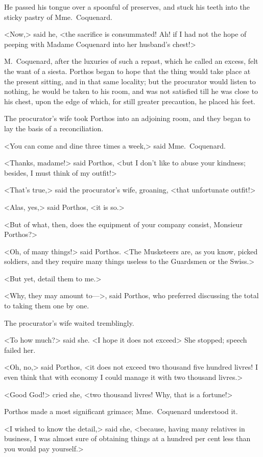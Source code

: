 He passed his tongue over a spoonful of preserves, and stuck his teeth into the sticky pastry of Mme.~Coquenard. 

<Now,> said he, <the sacrifice is consummated! Ah! if I had not the hope of peeping with Madame Coquenard into her husband's chest!> 

M.~Coquenard, after the luxuries of such a repast, which he called an excess, felt the want of a siesta. Porthos began to hope that the thing would take place at the present sitting, and in that same locality; but the procurator would listen to nothing, he would be taken to his room, and was not satisfied till he was close to his chest, upon the edge of which, for still greater precaution, he placed his feet. 

The procurator's wife took Porthos into an adjoining room, and they began to lay the basis of a reconciliation. 

<You can come and dine three times a week,> said Mme.~Coquenard. 

<Thanks, madame!> said Porthos, <but I don't like to abuse your kindness; besides, I must think of my outfit!> 

<That's true,> said the procurator's wife, groaning, <that unfortunate outfit!> 

<Alas, yes,> said Porthos, <it is so.> 

<But of what, then, does the equipment of your company consist, Monsieur Porthos?> 

<Oh, of many things!> said Porthos. <The Musketeers are, as you know, picked soldiers, and they require many things useless to the Guardsmen or the Swiss.> 

<But yet, detail them to me.> 

<Why, they may amount to—>, said Porthos, who preferred discussing the total to taking them one by one. 

The procurator's wife waited tremblingly. 

<To how much?> said she. <I hope it does not exceed\longdash> She stopped; speech failed her. 

<Oh, no,> said Porthos, <it does not exceed two thousand five hundred livres! I even think that with economy I could manage it with two thousand livres.> 

<Good God!> cried she, <two thousand livres! Why, that is a fortune!> 

Porthos made a most significant grimace; Mme.~Coquenard understood it. 

<I wished to know the detail,> said she, <because, having many relatives in business, I was almost sure of obtaining things at a hundred per cent less than you would pay yourself.> 

